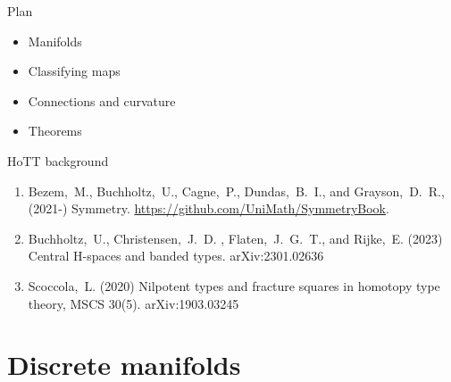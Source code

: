 \documentclass[14pt,aspectratio=169]{beamer}
\begin{document}

\begin{frame}{Plan}
\begin{itemize}
\item Manifolds
\item Classifying maps
\item Connections and curvature
\item Theorems
\end{itemize}
\end{frame}

\begin{frame}{HoTT background}
\begin{enumerate}
\item Bezem,~M., Buchholtz,~U., Cagne,~P., Dundas,~B.~I., and Grayson,~D.~R.,
  (2021-) Symmetry. \url{https://github.com/UniMath/SymmetryBook}.

\item Buchholtz,~U., Christensen,~J.~D. , Flaten,~J.~G.~T., and Rijke,~E. (2023) Central
  H-spaces and banded types. arXiv:2301.02636

\item Scoccola,~L. (2020) Nilpotent types and fracture squares in homotopy type theory, MSCS 30(5). arXiv:1903.03245
\end{enumerate}
\end{frame}

\section{Discrete manifolds}
\end{document}
